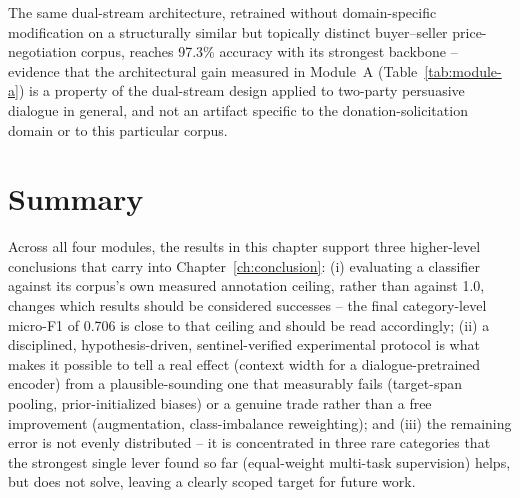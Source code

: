 The same dual-stream architecture, retrained without domain-specific
modification on a structurally similar but topically distinct
buyer--seller price-negotiation corpus, reaches 97.3\% accuracy with its
strongest backbone -- evidence that the architectural gain measured in
Module~A (Table~\ref{tab:module-a}) is a property of the dual-stream design
applied to two-party persuasive dialogue in general, and not an artifact
specific to the donation-solicitation domain or to this particular corpus.

\section{Summary}

Across all four modules, the results in this chapter support three
higher-level conclusions that carry into Chapter~\ref{ch:conclusion}: (i)
evaluating a classifier against its corpus's own measured annotation
ceiling, rather than against 1.0, changes which results should be considered
successes -- the final category-level micro-F1 of 0.706 is close to that
ceiling and should be read accordingly; (ii) a disciplined, hypothesis-driven,
sentinel-verified experimental protocol is what makes it possible to tell a
real effect (context width for a dialogue-pretrained encoder) from a
plausible-sounding one that measurably fails (target-span pooling,
prior-initialized biases) or a genuine trade rather than a free improvement
(augmentation, class-imbalance reweighting); and (iii) the remaining error
is not evenly distributed -- it is concentrated in three rare categories
that the strongest single lever found so far (equal-weight multi-task
supervision) helps, but does not solve, leaving a clearly scoped target for
future work.
